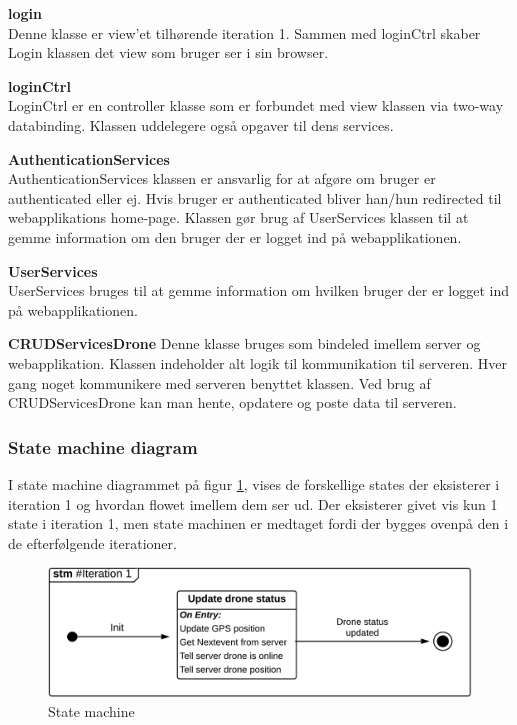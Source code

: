 \textbf{login} \\
Denne klasse er view'et tilhørende iteration 1. Sammen med loginCtrl skaber Login klassen det view som bruger ser i sin browser.

\textbf{loginCtrl} \\
LoginCtrl er en controller klasse som er forbundet med view klassen via two-way databinding. Klassen uddelegere også opgaver til dens services.

\textbf{AuthenticationServices} \\
AuthenticationServices klassen er ansvarlig for at afgøre om bruger er authenticated eller ej. Hvis bruger er authenticated bliver han/hun redirected til webapplikations home-page. Klassen gør brug af UserServices klassen til at gemme information om den bruger der er logget ind på webapplikationen.

\textbf{UserServices}\\
UserServices bruges til at gemme information om hvilken bruger der er logget ind på webapplikationen.

\textbf{CRUDServicesDrone}
Denne klasse bruges som bindeled imellem server og webapplikation. Klassen indeholder alt logik til kommunikation til serveren. Hver gang noget kommunikere med serveren benyttet klassen. Ved brug af CRUDServicesDrone kan man hente, opdatere og poste data til serveren.


\subsubsection*{State machine diagram}
\vspace{-0.1cm}
I state machine diagrammet på figur \ref{fig:Statemachine_iteration1}, vises de forskellige states der eksisterer i iteration 1 og hvordan flowet imellem dem ser ud. Der eksisterer givet vis kun 1 state i iteration 1, men state machinen er medtaget fordi der bygges ovenpå den i de efterfølgende iterationer.
\begin{figure}[H]
	\centering
	\includegraphics[width=1\textwidth]{Billeder/statemachine/State_iteration1.png}
	\vspace{-0.5cm}
	\caption{State machine}
	\label{fig:Statemachine_iteration1}
\end{figure}